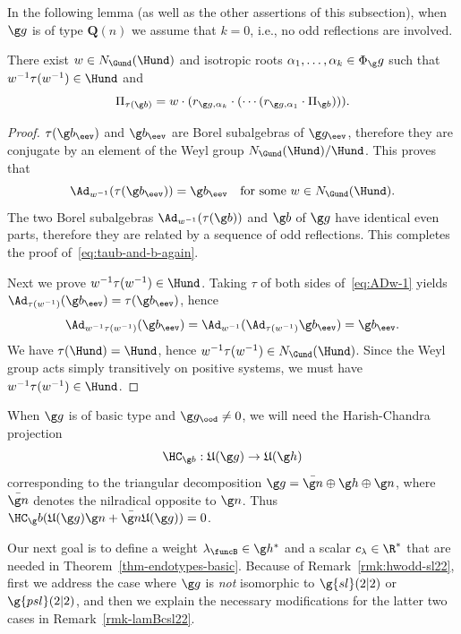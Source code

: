 \documentclass[12pt]{amsart}
\begin{document}
In the following lemma (as well as  the other assertions of this subsection), when  $\g g$ is of type $\mathbf Q(n)$ we assume that  $k=0$, i.e., no odd reflections are involved. 
\begin{lem}
\label{lem:seqisotr}
There exist $w\in N_{\Gund}(\Hund)$ and isotropic roots $\alpha_1,\ldots,\alpha_k\in\Phi_\g g$ such that   $w^{-1}\tau(w^{-1})\in \Hund$ and
\begin{equation}
\label{eq:taub-and-b-again}
\Pi_{\tau(\g b)}=
w\cdot (r_{\g g,\alpha_k}\cdot (\cdots( r_{\g g,\alpha_1}\cdot \Pi_{\g b}))).
\end{equation}
\end{lem}
\begin{proof}
$\tau(\g b_\eev)$ and $\g b_\eev$ are Borel subalgebras of $\g g_\eev$, therefore they are conjugate by an  element of the Weyl group $N_{\Gund}(\Hund)/\Hund$. This proves that 
\begin{equation}
\label{eq:ADw-1}
\Ad_{w^{-1}}(\tau(\g b_\eev))=\g b_\eev\quad\text{for some }w\in N_{\Gund}(\Hund).
\end{equation}
The two Borel subalgebras $\Ad_{w^{-1}}(\tau(\g b))$ and $\g b$ of $\g g$ have identical even parts, therefore they are related by a sequence of odd reflections. This completes the proof of~\eqref{eq:taub-and-b-again}. 

Next we prove $w^{-1}\tau(w^{-1})\in\Hund$. Taking $\tau$ of both sides of~\eqref{eq:ADw-1} 
yields
$
\Ad_{\tau(w^{-1})}(\g b_\eev)=\tau(\g b_\eev)
$, 
hence
\[
\Ad_{w^{-1}\tau(w^{-1})}(\g b_\eev)=\Ad_{w^{-1}}(\Ad_{\tau(w^{-1})}\g b_\eev)=\g b_\eev.
\]
We have $\tau(\Hund)=\Hund$, hence $w^{-1}\tau(w^{-1})\in N_{\Gund}(\Hund)$. Since the Weyl group acts simply transitively on positive systems, we must have $w^{-1}\tau(w^{-1})\in \Hund$. 
\end{proof}
When $\g g$ is of basic type and $\g g_\ood\neq 0$, we will need 
the Harish-Chandra projection
\[
\HC_{\g b}:\mathfrak U(\g g)\to\mathfrak  U(\g h)
\] 
corresponding to the triangular decomposition
$\g g=\bar{\g n}\oplus\g h\oplus \g n$, where $\bar{\g n}$ denotes the nilradical opposite to $\g n$.  Thus $\HC_\g b(\mathfrak  U(\g g)\g n+\bar{\g n}\mathfrak  U(\g g))=0$. 

Our next goal is to define a weight $\lambda_\funcB\in \g h^*$ and a scalar $c_\lambda\in \R^*$ that are needed in Theorem~\ref{thm-endotypes-basic}. Because of 
Remark~\ref{rmk:hwodd-sl22}, first we address the case where $\g g$ is \emph{not} isomorphic to $\g{sl}(2|2)$ or $\g{psl}(2|2)$, and then we explain the necessary modifications for the latter two cases in Remark~\ref{rmk-lamBcsl22}.
\end{document}
